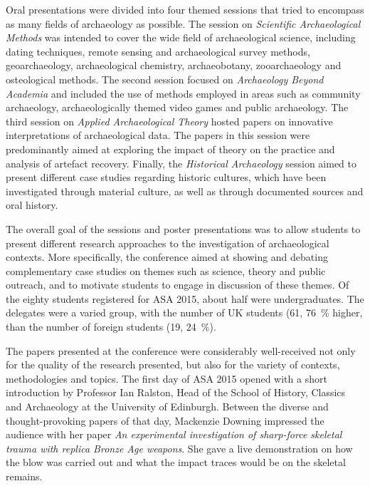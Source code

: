 	Oral presentations were divided into four themed sessions that tried to encompass as many fields of archaeology as possible. The session on \textit{Scientific Archaeological Methods} was intended to cover the wide field of archaeological science, including dating techniques, remote sensing and archaeological survey methods, geoarchaeology, archaeological chemistry, archaeobotany, zooarchaeology and osteological methods. The second session focused on \textit{Archaeology Beyond Academia} and included the use of methods employed in areas such as community archaeology, archaeologically themed video games and public archaeology. The third session on \textit{Applied Archaeological Theory} hosted papers on innovative interpretations of archaeological data. The papers in this session were predominantly aimed at exploring the impact of theory on the practice 
and analysis of artefact recovery. Finally, the \textit{Historical Archaeology} session aimed to present different case studies regarding historic cultures, which have been investigated through material culture, as well as through documented sources and oral history.
	
	The overall goal of the sessions and poster presentations was to allow students to present different research approaches to the investigation of archaeological contexts. More specifically, the conference aimed at showing and debating complementary case studies on themes such as science, theory and public outreach, and to motivate students to engage in discussion of these themes. Of the eighty students registered for ASA 2015, about half were undergraduates. The delegates were a varied group, with the number of UK students (61, \SI{76}{\percent} higher, than the number of foreign students (19, \SI{24}{\percent}).
	
	The papers presented at the conference were considerably well-received not only for the quality of the research presented, but also for the variety of contexts, methodologies and topics. The first day of ASA 2015 opened with a short introduction by Professor Ian Ralston, Head of the School of History, Classics and Archaeology at the University of Edinburgh. Between the diverse and thought-provoking papers of that day, Mackenzie Downing impressed the audience with her paper \textit{An experimental investigation of sharp-force skeletal trauma with replica Bronze Age weapons}. She gave a live demonstration on how the blow was carried out and what the impact traces would be on the skeletal remains.
	
